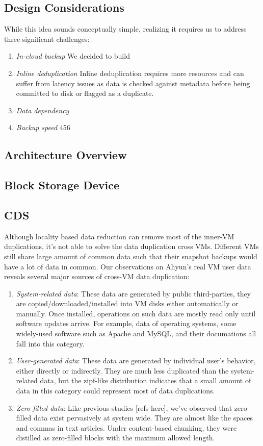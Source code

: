 \subsection{Design Considerations}
While this idea sounds conceptually simple, realizing it requires us to address three
significant challenges:
\begin{enumerate}
\item {\em In-cloud backup}
We decided to build 
\item {\em Inline deduplication}
Inline deduplication requires more resources and can suffer from latency issues as data is checked against metadata before being committed to disk or flagged as a duplicate.
\item {\em Data dependency}

\item {\em Backup speed}
456
\end{enumerate}
\subsection{Architecture Overview}

\subsection{Block Storage Device}
\subsection{CDS}
Although locality based data reduction can remove most of the inner-VM duplications,
it's not able to solve the data duplication cross VMs. Different VMs still share large amount
of common data such that their snapshot backups would have a lot of data in common.
Our observations on Aliyun's real VM user data reveals several major sources of cross-VM data duplication:
  \begin{enumerate}
  \item \emph{System-related data}: These data are generated by public third-parties, they are copied/downloaded/installed into VM disks either automatically or manually. Once installed, operations on such data are mostly read only until software updates arrive. For example, data of operating systems, some widely-used software such as Apache and MySQL, and their documations all fall into this category.
  \item \emph{User-generated data}: These data are generated by individual user's behavior, either directly or indirectly. They are much less duplicated than the system-related data, but the zipf-like distribution indicates that a small amount of data in this category could represent most of data duplications.
  \item \emph{Zero-filled data}: Like previous studies [refs here], we've observed that zero-filled data exist pervasively at system wide. They are almost like the spaces and commas in text articles. Under content-based chunking, they were distilled as zero-filled blocks with the maximum allowed length. 
  \end{enumerate}

